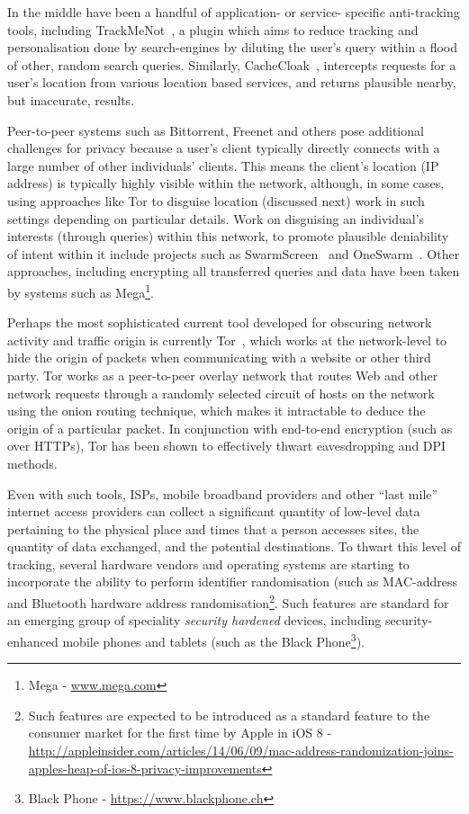 \documentclass{IOS-Book-Article}     %
\begin{document}
In the middle have been a handful of application- or service- specific anti-tracking tools, including TrackMeNot~\cite{howe2009trackmenot}, a plugin which aims to reduce tracking and personalisation done by search-engines by diluting the user's query within a flood of other, random search queries. Similarly, CacheCloak~\cite{Meyerowitz:2009:HSF:1614320.1614358}, intercepts requests for a user's location from various location based services, and returns plausible nearby, but inaccurate, results.  

Peer-to-peer systems such as Bittorrent, Freenet and others pose additional challenges for privacy because a user's client typically directly connects with a large number of other individuals' clients.  This means the client's location (IP address) is typically highly visible within the network, although, in some cases, using approaches like Tor to disguise location (discussed next) work in such settings depending on particular details.  Work on disguising an individual's interests (through queries) within this network, to promote plausible deniability of intent within it include projects such as SwarmScreen~\cite{choffnes2009swarmscreen} and OneSwarm~\cite{Isdal:2010:PPD:1851182.1851198}.  Other approaches, including encrypting all transferred queries and data have been taken by systems such as Mega\footnote{Mega - \url{www.mega.com}}.

Perhaps the most sophisticated current tool developed for obscuring network activity and traffic origin is currently Tor~\cite{dingledine2004tor}, which works at the network-level to hide the origin of packets when communicating with a website or other third party.  Tor works as a peer-to-peer overlay network that routes Web and other network requests through a randomly selected circuit of hosts on the network using the onion routing technique, which makes it intractable to deduce the origin of a particular packet.  In conjunction with end-to-end encryption (such as over HTTPs), Tor has been shown to effectively thwart eavesdropping and DPI methods.

Even with such tools, ISPs, mobile broadband providers and other ``last mile'' internet access providers can collect a significant quantity of low-level data pertaining to the physical place and times that a person accesses sites, the quantity of data exchanged, and the potential destinations.  To thwart this level of tracking, several hardware vendors and operating systems are starting to incorporate the ability to perform identifier randomisation (such as MAC-address and Bluetooth hardware address randomisation\footnote{Such features are expected to be introduced as a standard feature to the consumer market for the first time by Apple in iOS 8 - \url{http://appleinsider.com/articles/14/06/09/mac-address-randomization-joins-apples-heap-of-ios-8-privacy-improvements}}.  Such features are standard for an emerging group of speciality \emph{security hardened} devices, including security-enhanced mobile phones and tablets (such as the Black Phone\footnote{Black Phone - \url{https://www.blackphone.ch}}). 
\end{document}
